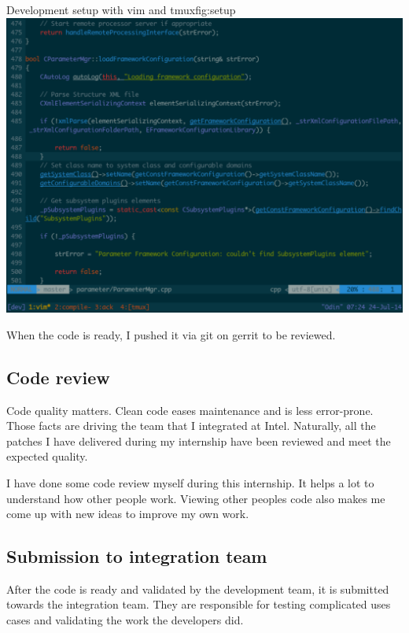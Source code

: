 \begin{figureGraphics}{Development setup with vim and tmux}{fig:setup}
\includegraphics[width=\textwidth]{./src/img/setup.pdf}
\end{figureGraphics}

When the code is ready, I pushed it via \gls{git} on \gls{gerrit} to be reviewed.

\subsection{Code review}
Code quality matters. Clean code eases maintenance and is less error-prone.
Those facts are driving the team that I integrated at Intel. Naturally, all the
patches I have delivered during my internship have been reviewed and meet the
expected quality.

I have done some code review myself during this internship. It helps a lot to
understand how other people work. Viewing other peoples code also makes me come
up with new ideas to improve my own work.

\subsection{Submission to integration team}
After the code is ready and validated by the development team, it is submitted towards the integration team.
They are responsible for testing complicated uses cases and validating the work the developers did.

